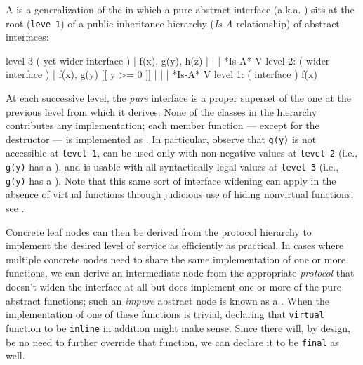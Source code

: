 {{A  is a generalization of the  in which a pure abstract interface (a.k.a.
) sits at the root (\lstinline!leve!}~\lstinline!1!) of a
public inheritance hierarchy (\emph{Is-A} relationship) of abstract
interfaces:

\begin{emcppslisting}
   level 3          ( yet wider interface )
                             |         f(x), g(y), h(z)
                             |
                             |
                             | *Is-A*
                             V
   level 2:           ( wider interface )
                             |         f(x), g(y) [[ y >= 0 ]]
                             |
                             |
                             | *Is-A*
                             V
   level 1:            ( interface )
                                       f(x)
\end{emcppslisting}
    

\noindent At each successive level, the \emph{pure} interface is a proper superset
of the one at the previous level from which it derives. None of the
classes in the hierarchy contributes any implementation; each member
function --- except for the destructor --- is implemented as
. In particular, observe that \lstinline!g(y)! is not
accessible at \lstinline!level!~\lstinline!1!, can be used only with
non-negative values at \lstinline!level!~\lstinline!2! (i.e., \lstinline!g(y)!
has a ), and is usable with all syntactically
legal values at \lstinline!level!~\lstinline!3! (i.e., \lstinline!g(y)! has a
). Note that this same sort of interface widening
can apply in the absence of virtual functions through judicious use of
hiding nonvirtual functions; see .

Concrete leaf nodes can then be derived from the protocol hierarchy to
implement the desired level of service as efficiently as practical. In
cases where multiple concrete nodes need to share the same
implementation of one or more functions, we can derive an intermediate
node from the appropriate \emph{protocol} that doesn't widen the
interface at all but does implement one or more of the pure abstract
functions; such an \emph{impure} abstract node is known as a
. When the implementation of one of these
functions is trivial, declaring that \lstinline!virtual! function to be
\lstinline!inline! in addition might make sense. Since there will, by
design, be no need to further override that function, we can declare it
to be \lstinline!final! as well.

}
